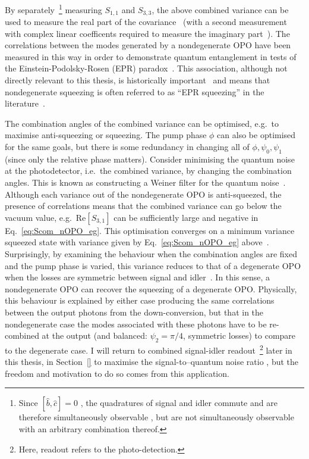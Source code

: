 By separately~\footnote{Since $[\hat b, \hat c]=0$ , the quadratures of signal and idler commute and are therefore simultaneously observable , but are not simultaneously observable with an arbitrary combination thereof.} measuring $S_{1,1}$ and $S_{3,3}$, the above combined variance can be used to measure the real part of the covariance~\cite{} (with a second measurement with complex linear coefficents required to measure the imaginary part~\cite{}). The correlations between the modes generated by a nondegenerate OPO have been measured in this way in order to demonstrate quantum entanglement in tests of the Einstein-Podolsky-Rosen (EPR) paradox~\cite{Reid1985,Schori2001,EPR19..}. This association, although not directly relevant to this thesis, is historically important~\cite{} and means that nondegenerate squeezing is often referred to as ``EPR squeezing'' in the literature~\cite{}. %

The combination angles of the combined variance can be optimised, e.g.\ to maximise anti-squeezing or squeezing. The pump phase $\phi$ can also be optimised for the same goals, but there is some redundancy in changing all of $\phi, \psi_0, \psi_1$ (since only the relative phase matters). Consider minimising the quantum noise at the photodetector, i.e.\ the combined variance, by changing the combination angles. This is known as constructing a Weiner filter for the quantum noise~\cite{}. Although each variance out of the nondegenerate OPO is anti-squeezed, the presence of correlations means that the combined variance can go below the vacuum value, e.g.\ $\text{Re}[S_{3,1}]$ can be sufficiently large and negative in Eq.~\ref{eq:Scom_nOPO_eg}. This optimisation  converges on a minimum variance squeezed state with variance given by Eq.~\ref{eq:Scom_nOPO_eg} above~\cite{}. Surprisingly, by examining the behaviour when the combination angles are fixed and the pump phase is varied, this variance reduces to that of a degenerate OPO when the losses are symmetric between signal and idler~\cite{}. In this sense, a nondegenerate OPO can recover the squeezing of a degenerate OPO. Physically, this behaviour is explained by either case producing the same correlations between the output photons from the down-conversion, but that in the nondegenerate case the modes associated with these photons have to be re-combined at the output (and balanced: $\psi_2=\pi/4$, symmetric losses) to compare to the degenerate case. 
I will return to combined signal-idler readout~\footnote{Here, readout refers to the photo-detection.} later in this thesis, in Section~\ref{} to maximise the signal-to--quantum noise ratio , but the freedom and motivation to do so comes  from this application.


